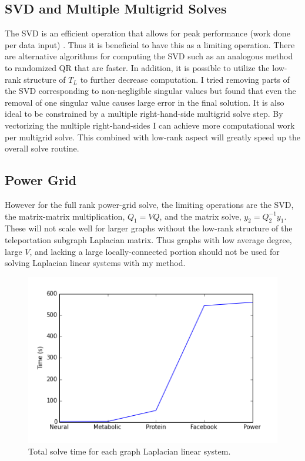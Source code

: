 \documentclass{article}
\begin{document}
\subsection{SVD and Multiple Multigrid Solves}
The SVD is an efficient operation that allows for peak performance (work done per data input) \cite{Berry:2006}. Thus it is beneficial to have this as a limiting operation. There are alternative algorithms for computing the SVD such as an analogous method to randomized QR \cite{Halko:2011} that are faster. In addition, it is possible to utilize the low-rank structure of $T_L$ to further decrease computation. I tried removing parts of the SVD corresponding to non-negligible singular values but found that even the removal of one singular value causes large error in the final solution. It is also ideal to be constrained by a multiple right-hand-side multigrid solve step. By vectorizing the multiple right-hand-sides I can achieve more computational work per multigrid solve. This combined with low-rank aspect will greatly speed up the overall solve routine.
\subsection{Power Grid}
However for the full rank power-grid solve, the limiting operations are the SVD, the matrix-matrix multiplication, $Q_1 = VQ$, and the matrix solve, $y_2 = Q_2^{-1}y_1$.  These will not scale well for larger graphs without the low-rank structure of the teleportation subgraph Laplacian matrix. Thus graphs with low average degree, large $V$, and lacking a large locally-connected portion should not be used for solving Laplacian linear systems with my method.

\begin{figure}[H]
\centering
\includegraphics[width = \linewidth]{total.png}
\caption{Total solve time for each graph Laplacian linear system.}
\end{figure}

%
%
\end{document}
